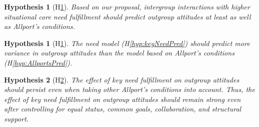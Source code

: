 \documentclass[man, 12pt, a4paper, mask]{apa7}
\theoremstyle{break}
\theoremstyle{plain}
\newtheorem{hyp}{Hypothesis}
\newtheorem{subhyp}{Hypothesis}
\begin{document}
\begin{hyp}[H\ref{hyp:comparison}] \label{hyp:comparison}
Based on our proposal, intergroup interactions with higher situational core need fulfillment should predict outgroup attitudes at least as well as Allport's conditions.
\end{hyp}

\setcounter{subhyp}{0}
\begin{subhyp}[H\ref{hyp:compModel}] \label{hyp:compModel}
\addtolength{\leftskip}{2.5em}
The need model (H\ref{hyp:keyNeedPred}) should predict more variance in outgroup attitudes than the model based on Allport's conditions (H\ref{hyp:AllportsPred}).
\end{subhyp}

\begin{subhyp}[H\ref{hyp:compTogether}] \label{hyp:compTogether}
\addtolength{\leftskip}{2.5em}
The  effect of key need fulfillment on outgroup attitudes should  persist even when taking other Allport's conditions into account. Thus, the effect of key need fulfillment on outgroup attitudes should remain strong even after controlling for equal status, common goals, collaboration, and structural support.  
\end{subhyp}
\end{document}
